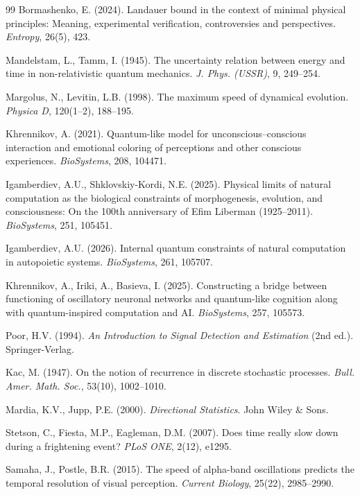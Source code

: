 \documentclass[12pt]{article}
\begin{document}
\begin{thebibliography}{99}
Bormashenko, E. (2024). Landauer bound in the context of minimal physical principles: Meaning, experimental verification, controversies and perspectives. \textit{Entropy}, 26(5), 423.

Mandelstam, L., Tamm, I. (1945). The uncertainty relation between energy and time in non-relativistic quantum mechanics. \textit{J. Phys. (USSR)}, 9, 249--254.

Margolus, N., Levitin, L.B. (1998). The maximum speed of dynamical evolution. \textit{Physica D}, 120(1--2), 188--195.

Khrennikov, A. (2021). Quantum-like model for unconscious--conscious interaction and emotional coloring of perceptions and other conscious experiences. \textit{BioSystems}, 208, 104471.

Igamberdiev, A.U., Shklovskiy-Kordi, N.E. (2025). Physical limits of natural computation as the biological constraints of morphogenesis, evolution, and consciousness: On the 100th anniversary of Efim Liberman (1925--2011). \textit{BioSystems}, 251, 105451.

Igamberdiev, A.U. (2026). Internal quantum constraints of natural computation in autopoietic systems. \textit{BioSystems}, 261, 105707.

Khrennikov, A., Iriki, A., Basieva, I. (2025). Constructing a bridge between functioning of oscillatory neuronal networks and quantum-like cognition along with quantum-inspired computation and AI. \textit{BioSystems}, 257, 105573.

Poor, H.V. (1994). \textit{An Introduction to Signal Detection and Estimation} (2nd ed.). Springer-Verlag.

Kac, M. (1947). On the notion of recurrence in discrete stochastic processes. \textit{Bull. Amer. Math. Soc.}, 53(10), 1002--1010.

Mardia, K.V., Jupp, P.E. (2000). \textit{Directional Statistics}. John Wiley \& Sons.

Stetson, C., Fiesta, M.P., Eagleman, D.M. (2007). Does time really slow down during a frightening event? \textit{PLoS ONE}, 2(12), e1295.

Samaha, J., Postle, B.R. (2015). The speed of alpha-band oscillations predicts the temporal resolution of visual perception. \textit{Current Biology}, 25(22), 2985--2990.


\end{thebibliography}
\end{document}
